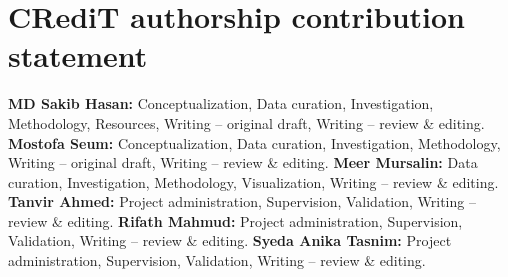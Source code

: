\documentclass[a4paper,fleqn]{cas-sc}
\begin{document}
\section*{CRediT authorship contribution statement}
\textbf{MD Sakib Hasan:} Conceptualization, Data curation, Investigation, Methodology, Resources, Writing -- original draft, Writing -- review \& editing. \textbf{Mostofa Seum:} Conceptualization, Data curation, Investigation, Methodology, Writing -- original draft, Writing -- review \& editing. \textbf{Meer Mursalin:} Data curation, Investigation, Methodology, Visualization, Writing -- review \& editing. \textbf{Tanvir Ahmed:} Project administration, Supervision, Validation, Writing -- review \& editing. \textbf{Rifath Mahmud:} Project administration, Supervision, Validation, Writing -- review \& editing. \textbf{Syeda Anika Tasnim:} Project administration, Supervision, Validation, Writing -- review \& editing.



\end{document}
